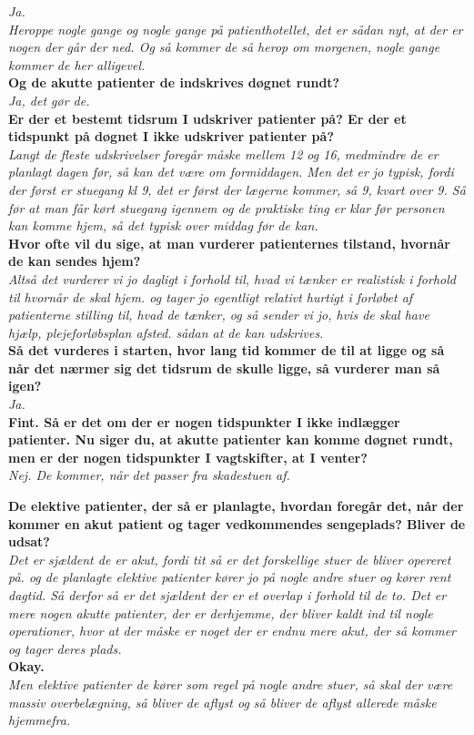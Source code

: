\noindent
\textit{Ja.} \\
\noindent
\textit{Heroppe nogle gange og nogle gange på patienthotellet, det er sådan nyt, at der er nogen der går der ned. Og så kommer de så herop om morgenen, nogle gange kommer de her alligevel.} \\
\noindent
\textbf{Og de akutte patienter de indskrives døgnet rundt?} \\
\noindent
\textit{ Ja, det gør de.} \\
\noindent
\textbf{Er der et bestemt tidsrum I udskriver patienter på? Er der et tidspunkt på døgnet I ikke udskriver patienter på?} \\
\noindent
\textit{Langt de fleste udskrivelser foregår måske mellem 12 og 16, medmindre de er planlagt dagen før, så kan det være om formiddagen. Men det er jo typisk, fordi der først er stuegang kl 9, det er først der lægerne kommer, så 9, kvart over 9. Så før at man får kørt stuegang igennem og de praktiske ting er klar før personen kan komme hjem, så det typisk over middag før de kan. } \\
\noindent
\textbf{Hvor ofte vil du sige, at man vurderer patienternes tilstand, hvornår de kan sendes hjem?}  \\
\noindent
\textit{Altså det vurderer vi jo dagligt i forhold til, hvad vi tænker er realistisk i forhold til hvornår de skal hjem. og tager jo egentligt relativt hurtigt i forløbet af patienterne stilling til, hvad de tænker, og så sender vi jo, hvis de skal have hjælp, plejeforløbsplan afsted. sådan at de kan udskrives.} \\
\noindent
\textbf{Så det vurderes i starten, hvor lang tid kommer de til at ligge og så når det nærmer sig det tidsrum de skulle ligge, så vurderer man så igen?} \\
\noindent
\textit{Ja.} \\
\noindent
\textbf{Fint. Så er det om der er nogen tidspunkter I ikke indlægger patienter. Nu siger du, at akutte patienter kan komme døgnet rundt, men er der nogen tidspunkter I vagtskifter, at I venter?} \\
\noindent
\textit{Nej. De kommer, når det passer fra skadestuen af.} \\
\noindent


\textbf{De elektive patienter, der så er planlagte, hvordan foregår det, når der kommer en akut patient og tager vedkommendes sengeplads? Bliver de udsat?} \\
\noindent
\textit{Det er sjældent de er akut, fordi tit så er det forskellige stuer de bliver opereret på. og de planlagte elektive patienter kører jo på nogle andre stuer og kører rent dagtid. Så derfor så er det sjældent der er et overlap i forhold til de to. Det er mere nogen akutte patienter, der er derhjemme, der bliver kaldt ind til nogle operationer, hvor at der måske er noget der er endnu mere akut, der så kommer og tager deres plads.} \\
\noindent
\textbf{Okay.} \\
\noindent
\textit{Men elektive patienter de kører som regel på nogle andre stuer, så skal der være massiv overbelægning, så bliver de aflyst og så bliver de aflyst allerede måske hjemmefra.} \\
\noindent

